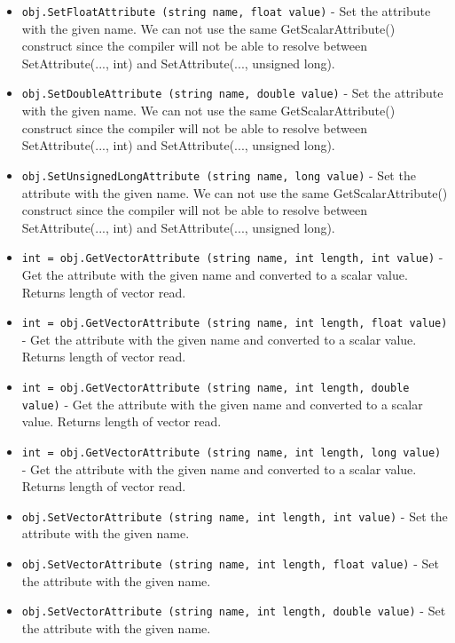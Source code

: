 \begin{itemize}
\item  \verb|obj.SetFloatAttribute (string name, float value)| -  Set the attribute with the given name.
 We can not use the same GetScalarAttribute() construct since
 the compiler will not be able to resolve between
 SetAttribute(..., int) and SetAttribute(..., unsigned long).

\item  \verb|obj.SetDoubleAttribute (string name, double value)| -  Set the attribute with the given name.
 We can not use the same GetScalarAttribute() construct since
 the compiler will not be able to resolve between
 SetAttribute(..., int) and SetAttribute(..., unsigned long).

\item  \verb|obj.SetUnsignedLongAttribute (string name, long value)| -  Set the attribute with the given name.
 We can not use the same GetScalarAttribute() construct since
 the compiler will not be able to resolve between
 SetAttribute(..., int) and SetAttribute(..., unsigned long).

\item  \verb|int = obj.GetVectorAttribute (string name, int length, int value)| -  Get the attribute with the given name and converted to a scalar
 value.  Returns length of vector read.

\item  \verb|int = obj.GetVectorAttribute (string name, int length, float value)| -  Get the attribute with the given name and converted to a scalar
 value.  Returns length of vector read.

\item  \verb|int = obj.GetVectorAttribute (string name, int length, double value)| -  Get the attribute with the given name and converted to a scalar
 value.  Returns length of vector read.

\item  \verb|int = obj.GetVectorAttribute (string name, int length, long value)| -  Get the attribute with the given name and converted to a scalar
 value.  Returns length of vector read.

\item  \verb|obj.SetVectorAttribute (string name, int length, int value)| -  Set the attribute with the given name.

\item  \verb|obj.SetVectorAttribute (string name, int length, float value)| -  Set the attribute with the given name.

\item  \verb|obj.SetVectorAttribute (string name, int length, double value)| -  Set the attribute with the given name.


\end{itemize}
